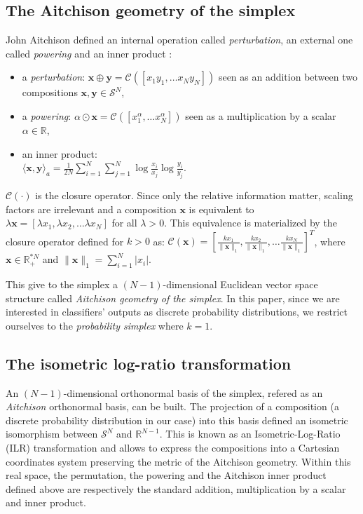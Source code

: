 \documentclass{article}
\theoremstyle{plain}
\theoremstyle{definition}
\theoremstyle{remark}
\begin{document}
\subsection{The Aitchison geometry of the simplex}
John Aitchison defined an internal operation called \emph{perturbation}, an external one called \emph{powering} and an inner product \cite{aitchison2001}:
\begin{itemize}
\item a \emph{perturbation}:
  $\bm{x}\oplus \bm{y} = \mathcal{C}\left([x_1y_1,\dots x_{N}y_{N}]\right)$ seen as an addition between two compositions $\bm{x},\bm{y}\in \mathcal{S}^N$,
\item a \emph{powering}:
  $\alpha \odot \bm{x} = \mathcal{C}\left([x_{1}^{\alpha},\dots x_{N}^{\alpha}]\right)$ seen as a multiplication by a scalar $\alpha \in \mathbb{R}$,
\item an inner product:\\
  $\displaystyle \langle \bm{x},\bm{y} \rangle_a = \frac{1}{2N}\sum_{i=1}^{N} \sum_{j=1}^{N} \log \frac{x_i}{x_j}\log \frac{y_i}{y_j}$.
\end{itemize}
$\mathcal{C}(\cdot)$ is the closure operator. Since only the relative information matter, scaling factors are irrelevant and a composition $\bm{x}$ is equivalent to $\lambda \bm{x} = [\lambda x_1,\lambda x_2,\dots\lambda x_N]$ for all $\lambda>0$. This equivalence is materialized by the closure operator defined for $k>0$ as: $\mathcal{C}\left(\bm{x} \right) = \left[ \frac{k x_1}{\lVert \bm{x} \rVert_1}, \frac{k x_2}{\lVert \bm{x} \rVert_1} ,\dots \frac{k x_N}{\lVert \bm{x} \rVert_1} \right]^T$, where $\bm{x} \in \mathbb{R}_+^{*N}$ and $\displaystyle \lVert \bm{x} \rVert_1 = \sum_{i=1}^N \lvert x_i \rvert$.%

This give to the simplex a $(N-1)$-dimensional Euclidean vector space structure called \emph{Aitchison geometry of the simplex}. In this paper, since we are interested in classifiers' outputs as discrete probability distributions, we restrict ourselves to the \emph{probability simplex} where $k=1$.

\subsection{The isometric log-ratio transformation}
\label{sec:ilr}

An $(N-1)$-dimensional orthonormal basis of the simplex, refered as an \emph{Aitchison} orthonormal basis, can be built. The projection of a composition (a discrete probability distribution in our case) into this basis defined an isometric isomorphism between $\mathcal{S}^N$ and $\mathbb{R}^{N-1}$. This is known as an Isometric-Log-Ratio (ILR) transformation \cite{egozcue2003isometric} and allows to express the compositions into a Cartesian coordinates system preserving the metric of the Aitchison geometry. Within this real space, the permutation, the powering and the Aitchison inner product defined above are respectively the standard addition, multiplication by a scalar and inner product.
\end{document}
